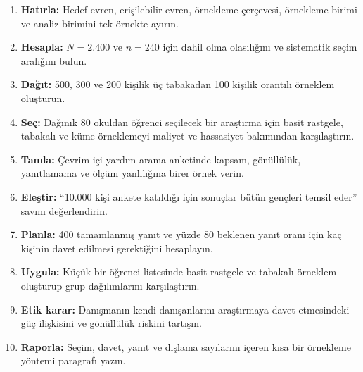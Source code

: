 \begin{enumerate}
\renewcommand{\labelenumi}{\textbf{\Alph{enumi}.}}
  \item \textbf{Hatırla:} Hedef evren, erişilebilir evren, örnekleme çerçevesi, örnekleme birimi ve analiz birimini tek örnekte ayırın.
  \item \textbf{Hesapla:} $N=2.400$ ve $n=240$ için dahil olma olasılığını ve sistematik seçim aralığını bulun.
  \item \textbf{Dağıt:} 500, 300 ve 200 kişilik üç tabakadan 100 kişilik orantılı örneklem oluşturun.
  \item \textbf{Seç:} Dağınık 80 okuldan öğrenci seçilecek bir araştırma için basit rastgele, tabakalı ve küme örneklemeyi maliyet ve hassasiyet bakımından karşılaştırın.
  \item \textbf{Tanıla:} Çevrim içi yardım arama anketinde kapsam, gönüllülük, yanıtlamama ve ölçüm yanlılığına birer örnek verin.
  \item \textbf{Eleştir:} ``10.000 kişi ankete katıldığı için sonuçlar bütün gençleri temsil eder'' savını değerlendirin.
  \item \textbf{Planla:} 400 tamamlanmış yanıt ve yüzde 80 beklenen yanıt oranı için kaç kişinin davet edilmesi gerektiğini hesaplayın.
  \item \textbf{Uygula:} Küçük bir öğrenci listesinde basit rastgele ve tabakalı örneklem oluşturup grup dağılımlarını karşılaştırın.
  \item \textbf{Etik karar:} Danışmanın kendi danışanlarını araştırmaya davet etmesindeki güç ilişkisini ve gönüllülük riskini tartışın.
  \item \textbf{Raporla:} Seçim, davet, yanıt ve dışlama sayılarını içeren kısa bir örnekleme yöntemi paragrafı yazın.
\end{enumerate}

